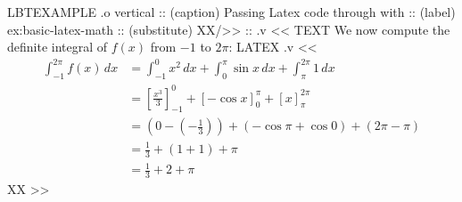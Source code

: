 \begin{lbt}
    LBTEXAMPLE .o vertical
    :: (caption) Passing Latex code through with 
    :: (label) ex:basic-latex-math
    :: (substitute) XX/>>
    :: .v <<
      TEXT We now compute the definite integral of $f(x)$ from $-1$ to $2\pi$:
      LATEX .v <<
        \begin{align*}
        \int_{-1}^{2\pi} f(x)\,dx 
        &= \int_{-1}^{0} x^2\,dx 
          + \int_{0}^{\pi} \sin x\,dx 
          + \int_{\pi}^{2\pi} 1\,dx \\
        &= \left[\frac{x^3}{3}\right]_{-1}^{0} 
          + \left[-\cos x\right]_{0}^{\pi} 
          + \left[x\right]_{\pi}^{2\pi} \\
        &= \left(0 - \left(-\frac{1}{3}\right)\right) 
          + \left(-\cos \pi + \cos 0\right) 
          + \left(2\pi - \pi\right) \\
        &= \frac{1}{3} + (1 + 1) + \pi \\
        &= \frac{1}{3} + 2 + \pi
        \end{align*}
      XX
    >>



    


\end{lbt}
